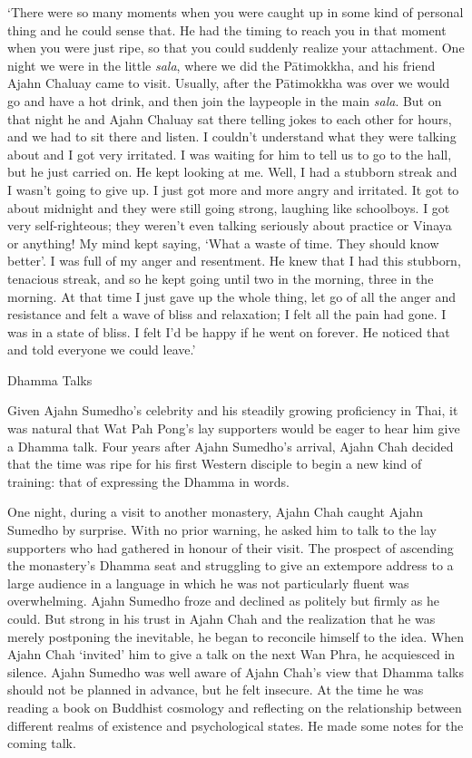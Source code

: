 `There were so many moments when you were caught up in some kind of
personal thing and he could sense that. He had the timing to reach you
in that moment when you were just ripe, so that you could suddenly
realize your attachment. One night we were in the little \emph{sala},
where we did the Pātimokkha, and his friend Ajahn Chaluay came to visit.
Usually, after the Pātimokkha was over we would go and have a hot drink,
and then join the laypeople in the main \emph{sala}. But on that night
he and Ajahn Chaluay sat there telling jokes to each other for hours,
and we had to sit there and listen. I couldn't understand what they were
talking about and I got very irritated. I was waiting for him to tell us
to go to the hall, but he just carried on. He kept looking at me. Well,
I had a stubborn streak and I wasn't going to give up. I just got more
and more angry and irritated. It got to about midnight and they were
still going strong, laughing like schoolboys. I got very self-righteous;
they weren't even talking seriously about practice or Vinaya or
anything! My mind kept saying, `What a waste of time. They should know
better'. I was full of my anger and resentment. He knew that I had this
stubborn, tenacious streak, and so he kept going until two in the
morning, three in the morning. At that time I just gave up the whole
thing, let go of all the anger and resistance and felt a wave of bliss
and relaxation; I felt all the pain had gone. I was in a state of bliss.
I felt I'd be happy if he went on forever. He noticed that and told
everyone we could leave.'

Dhamma Talks

Given Ajahn Sumedho's celebrity and his steadily growing proficiency in
Thai, it was natural that Wat Pah Pong's lay supporters would be eager
to hear him give a Dhamma talk. Four years after Ajahn Sumedho's
arrival, Ajahn Chah decided that the time was ripe for his first Western
disciple to begin a new kind of training: that of expressing the Dhamma
in words.

One night, during a visit to another monastery, Ajahn Chah caught Ajahn
Sumedho by surprise. With no prior warning, he asked him to talk to the
lay supporters who had gathered in honour of their visit. The prospect
of ascending the monastery's Dhamma seat and struggling to give an
extempore address to a large audience in a language in which he was not
particularly fluent was overwhelming. Ajahn Sumedho froze and declined
as politely but firmly as he could. But strong in his trust in Ajahn
Chah and the realization that he was merely postponing the inevitable,
he began to reconcile himself to the idea. When Ajahn Chah `invited' him
to give a talk on the next Wan Phra, he acquiesced in silence. Ajahn
Sumedho was well aware of Ajahn Chah's view that Dhamma talks should not
be planned in advance, but he felt insecure. At the time he was reading
a book on Buddhist cosmology and reflecting on the relationship between
different realms of existence and psychological states. He made some
notes for the coming talk.

